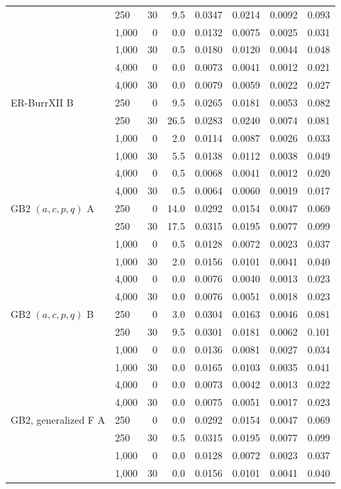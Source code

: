 {\begin{longtable}{llrrrrrr}
 & 250 & 30 & 9.5 & 0.0347 & 0.0214 & 0.0092 & 0.093 \\
 & 1,000 & 0 & 0.0 & 0.0132 & 0.0075 & 0.0025 & 0.031 \\
 & 1,000 & 30 & 0.5 & 0.0180 & 0.0120 & 0.0044 & 0.048 \\
 & 4,000 & 0 & 0.0 & 0.0073 & 0.0041 & 0.0012 & 0.021 \\
 & 4,000 & 30 & 0.0 & 0.0079 & 0.0059 & 0.0022 & 0.027 \\
ER-BurrXII B & 250 & 0 & 9.5 & 0.0265 & 0.0181 & 0.0053 & 0.082 \\
 & 250 & 30 & 26.5 & 0.0283 & 0.0240 & 0.0074 & 0.081 \\
 & 1,000 & 0 & 2.0 & 0.0114 & 0.0087 & 0.0026 & 0.033 \\
 & 1,000 & 30 & 5.5 & 0.0138 & 0.0112 & 0.0038 & 0.049 \\
 & 4,000 & 0 & 0.5 & 0.0068 & 0.0041 & 0.0012 & 0.020 \\
 & 4,000 & 30 & 0.5 & 0.0064 & 0.0060 & 0.0019 & 0.017 \\
GB2 $(a,c,p,q)$ A & 250 & 0 & 14.0 & 0.0292 & 0.0154 & 0.0047 & 0.069 \\
 & 250 & 30 & 17.5 & 0.0315 & 0.0195 & 0.0077 & 0.099 \\
 & 1,000 & 0 & 0.5 & 0.0128 & 0.0072 & 0.0023 & 0.037 \\
 & 1,000 & 30 & 2.0 & 0.0156 & 0.0101 & 0.0041 & 0.040 \\
 & 4,000 & 0 & 0.0 & 0.0076 & 0.0040 & 0.0013 & 0.023 \\
 & 4,000 & 30 & 0.0 & 0.0076 & 0.0051 & 0.0018 & 0.023 \\
GB2 $(a,c,p,q)$ B & 250 & 0 & 3.0 & 0.0304 & 0.0163 & 0.0046 & 0.081 \\
 & 250 & 30 & 9.5 & 0.0301 & 0.0181 & 0.0062 & 0.101 \\
 & 1,000 & 0 & 0.0 & 0.0136 & 0.0081 & 0.0027 & 0.034 \\
 & 1,000 & 30 & 0.0 & 0.0165 & 0.0103 & 0.0035 & 0.041 \\
 & 4,000 & 0 & 0.0 & 0.0073 & 0.0042 & 0.0013 & 0.022 \\
 & 4,000 & 30 & 0.0 & 0.0075 & 0.0051 & 0.0017 & 0.023 \\
GB2, generalized F A & 250 & 0 & 0.0 & 0.0292 & 0.0154 & 0.0047 & 0.069 \\
 & 250 & 30 & 0.5 & 0.0315 & 0.0195 & 0.0077 & 0.099 \\
 & 1,000 & 0 & 0.0 & 0.0128 & 0.0072 & 0.0023 & 0.037 \\
 & 1,000 & 30 & 0.0 & 0.0156 & 0.0101 & 0.0041 & 0.040 \\

\end{longtable}}
